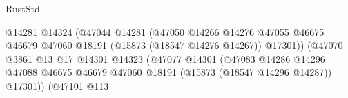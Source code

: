 \begin{lexlean}{RustStd}
\begin{coremodule}
                                                                @14281
                                                                @14324
                                                                (@47044
                                                                  @14281
                                                                  (@47050
                                                                    @14266
                                                                    @14276
                                                                    @47055
                                                                    @46675
                                                                    @46679
                                                                    @47060
                                                                    @18191
                                                                    (@15873 (@18547 @14276 @14267))
                                                                    @17301))
                                                                (@47070
                                                                  @3861
                                                                  @13
                                                                  @17
                                                                  @14301
                                                                  @14323
                                                                  (@47077
                                                                    @14301
                                                                    (@47083
                                                                      @14286
                                                                      @14296
                                                                      @47088
                                                                      @46675
                                                                      @46679
                                                                      @47060
                                                                      @18191
                                                                      (@15873
                                                                        (@18547 @14296 @14287))
                                                                      @17301))
                                                                  (@47101
                                                                    @113

\end{coremodule}
\end{lexlean}
